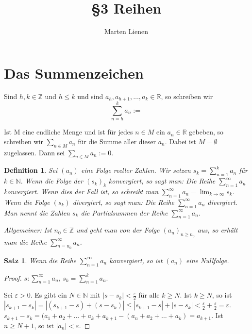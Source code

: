 \documentclass[a4paper,10pt]{article}
\title{§3 Reihen}
\author{Marten Lienen}
\newtheorem{definition}{Definition}
\newtheorem{satz}{Satz}
\begin{document}
\maketitle

\section*{Das Summenzeichen}

Sind $h, k \in \mathbb{Z}$ und $h \le k$ und sind $a_h, a_{h + 1}, \dots, a_k \in \mathbb{R}$, so schreiben wir
\begin{equation*}
 \sum_{n=h}^k a_n := 
\end{equation*}

Ist M eine endliche Menge und ist für jedes $n \in M$ ein $a_n \in \mathbb{R}$ gebeben, so schreiben wir $\sum_{n \in M} a_n$ für die Summe aller dieser $a_n$.
Dabei ist $M = \emptyset$ zugelassen.
Dann sei $\sum_{n \in M} a_n := 0$.

\begin{definition}
 Sei $(a_n)$ eine Folge reeller Zahlen.
 Wir setzen $s_k = \sum_{n = 1}^k a_n$ für $k \in \mathbb{N}$.
 Wenn die Folge der $(s_k)_k$ konvergiert, so sagt man: Die Reihe $\sum_{n = 1}^\infty a_n$ konvergiert.
 Wenn dies der Fall ist, so schreibt man $\sum_{n = 1}^\infty a_n = \lim_{k \rightarrow \infty} s_k$.
 Wenn die Folge $(s_k)$ divergiert, so sagt man: Die Reihe $\sum_{n = 1}^\infty a_n$ divergiert.
 Man nennt die Zahlen $s_k$ die Partialsummen der Reihe $\sum_{n = 1}^\infty a_n$.
 
 Allgemeiner: Ist $n_0 \in \mathbb{Z}$ und geht man von der Folge $(a_n)_{n \ge n_0}$ aus, so erhält man die Reihe $\sum_{n = n_0}^\infty a_n$.
\end{definition}

\begin{satz}
 Wenn die Reihe $\sum_{n = 1}^\infty a_n$ konvergiert, so ist $(a_n)$ eine Nullfolge.
\end{satz}

\begin{proof}
 $s: \sum_{n = 1}^\infty a_n$, $s_k = \sum_{n = 1}^k a_n$.
 
 Sei $\varepsilon > 0$.
 Es gibt ein $N \in \mathbb{N}$ mit $|s - s_k| < \frac{\varepsilon}{2}$ für alle $k \ge N$.
 Ist $k \ge N$, so ist $|s_{k + 1} - s_k| = |(s_{k + 1} - s) + (s - s_k)| \le |s_{k + 1} - s| + |s - s_k| < \frac{\varepsilon}{2} + \frac{\varepsilon}{2} = \varepsilon$.
 $s_{k + 1} - s_k = (a_1 + a_2 + \dots + a_k + a_{k + 1} - (a_n + a_2 + \dots + a_k) = a_{k + 1}$.
 Ist $n \ge N + 1$, so ist $|a_n| < \varepsilon$.
\end{proof}
\end{document}

